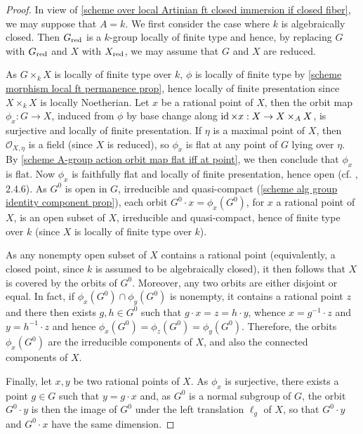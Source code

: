 \begin{proof}
In view of \cref{scheme over local Artinian ft closed immersion if closed fiber}, we may suppose that $A=k$. We first consider the case where $k$ is algebraically closed. Then $G_{\mathrm{red}}$ is a $k$-group locally of finite type and hence, by replacing $G$ with $G_{\mathrm{red}}$ and $X$ with $X_{\mathrm{red}}$, we may assume that $G$ and $X$ are reduced.\par
As $G\times_kX$ is locally of finite type over $k$, $\phi$ is locally of finite type by \cref{scheme morphism local ft permanence prop}, hence locally of finite presentation since $X\times_kX$ is locally Noetherian. Let $x$ be a rational point of $X$, then the orbit map $\phi_x:G\to X$, induced from $\phi$ by base change along $\operatorname{id}\times x:X\to X\times_AX$, is surjective and locally of finite presentation. If $\eta$ is a maximal point of $X$, then $\mathscr{O}_{X,\eta}$ is a field (since $X$ is reduced), so $\phi_x$ is flat at any point of $G$ lying over $\eta$. By \cref{scheme A-group action orbit map flat iff at point}, we then conclude that $\phi_x$ is flat. Now $\phi_x$ is faithfully flat and locally of finite presentation, hence open (cf. \cite{EGA4-2}, 2.4.6). As $G^0$ is open in $G$, irreducible and quasi-compact (\cref{scheme alg group identity component prop}), each orbit $G^0\cdot x=\phi_x(G^0)$, for $x$ a rational point of $X$, is an open subset of $X$, irreducible and quasi-compact, hence of finite type over $k$ (since $X$ is locally of finite type over $k$).\par
As any nonempty open subset of $X$ contains a rational point (equivalently, a closed point, since $k$ is assumed to be algebraically closed), it then follows that $X$ is covered by the orbits of $G^0$. Moreover, any two orbits are either disjoint or equal. In fact, if $\phi_x(G^0)\cap\phi_y(G^0)$ is nonempty, it contains a rational point $z$ and there then exists $g,h\in G^0$ such that $g\cdot x=z=h\cdot y$, whence $x=g^{-1}\cdot z$ and $y=h^{-1}\cdot z$ and hence $\phi_x(G^0)=\phi_z(G^0)=\phi_y(G^0)$. Therefore, the orbits $\phi_x(G^0)$ are the irreducible components of $X$, and also the connected components of $X$.\par
Finally, let $x,y$ be two rational points of $X$. As $\phi_x$ is surjective, there exists a point $g\in G$ such that $y=g\cdot x$ and, as $G^0$ is a normal subgroup of $G$, the orbit $G^0\cdot y$ is then the image of $G^0$ under the left translation $\ell_g$ of $X$, so that $G^0\cdot y$ and $G^0\cdot x$ have the same dimension.\par

\end{proof}

